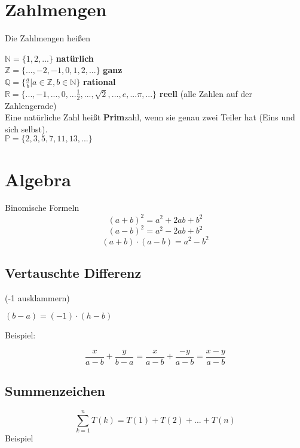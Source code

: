 \arbeitsblattHeader{}
 \begin{multicols}{2}

\section{Zahlmengen}
\begin{definition}{}{}
Die Zahlmengen heißen

$\mathbb{N} = \{1,2, ...\}  $ \textbf{natürlich}\\
$\mathbb{Z} = \{..., -2, -1, 0, 1,2, ...\}  $ \textbf{ganz}\\
$\mathbb{Q} = \{\frac{a}b | a\in \mathbb{Z}, b\in\mathbb{N}\}$ \textbf{rational}\\
$\mathbb{R} = \{..., -1, ..., 0, ... \frac12, ..., \sqrt{2}, ..., e, ... \pi, ...\}  $ \textbf{reell} (alle Zahlen auf der Zahlengerade)\\

Eine natürliche Zahl heißt \textbf{Prim}zahl, wenn sie genau zwei Teiler hat (Eins und sich selbst).\\ $\mathbb{P} = \{2, 3, 5, 7, 11, 13, ...\}$
\end{definition}

\hrulefill

\section{Algebra}

\begin{gesetz}{Binomische Formeln}{}
$$(a+b)^2 = a^2+2ab + b^2$$
$$(a-b)^2=a^2-2ab+b^2$$
$$(a+b)\cdot(a-b) = a^2 - b^2$$
\end{gesetz}

\subsection{Vertauschte Differenz}
(-1 ausklammern)

$(b-a)=(-1)\cdot{}(h-b)$

Beispiel:

$$\frac{x}{a-b} +  \frac{y}{b-a} = \frac{x}{a-b} + \frac{-y}{a-b} = \frac{x-y}{a-b}$$

\subsection{Summenzeichen}
$$\sum_{k=1}^n{T(k)} = T(1) + T(2) + ... + T(n)$$
Beispiel


\end{multicols}
